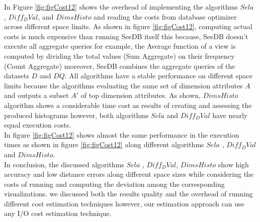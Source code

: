 


In Figure \ref{fig:figCost12} shows the overhead of implementing the 
algorithms $Sela$ ,  $Diff_DVal$, and $DimsHisto$ and reading the costs from database
optimizer across different space limits. As shown in figure 
\ref{fig:figCost12}, computing actual costs is much expensive than running SeeDB 
itself this because, SeeDB doesn't execute all aggregate queries for example, the Average 
function of a view is computed by dividing the total values (Sum Aggregate) on their frequency 
(Count Aggregate) moreover, SeeDB combines the aggregate queries of the datasets 
$D$ and $DQ$. All algorithms have a stable performance on different space limits
because the algorithms evaluating the same set of dimension attributes $A$ and outputs
a subset $A'$ of top dimension attributes. As shown, $DimsHisto$ algorithm shows a 
considerable time cost as results of creating and assessing the produced histograms however, both  
algorithms $Sela$ and $Diff_DVal$ have nearly equal execution costs. \\
  


In figure \ref{fig:figCost12} shows almost the same performance in the execution times 
as shown in figure \ref{fig:figCost12} along different algorithms $Sela$ , $Diff_DVal$ and 
$DimsHisto$.\\

 In conclusion, the discussed algorithms $Sela$ , $Diff_DVal$, $DimsHisto$ show high 
 accuracy and low distance errors along different space sizes while considering the costs of 
 running and computing the deviation among the corresponding visualizations. we discussed both 
 the results quality and the overhead of running different cost estimation techniques  
 however, our estimation approach can use any I/O cost estimation technique. %
  
